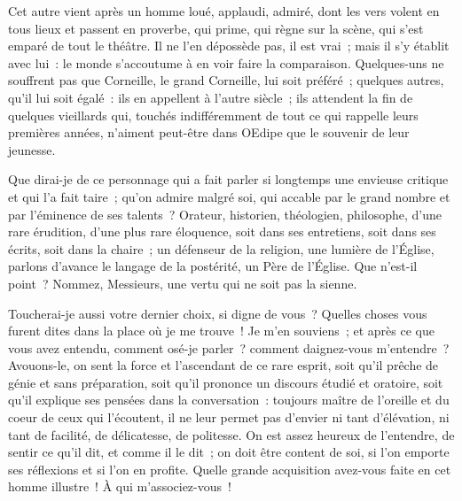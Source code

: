 \documentclass[french,twoside]{book} %
\begin{document}
Cet autre vient après un homme loué, applaudi, admiré, dont les vers volent en tous lieux et passent en proverbe, qui prime, qui règne sur la scène, qui s’est emparé de tout le théâtre. Il ne l’en dépossède pas, il est vrai ; mais il s’y établit avec lui : le monde s’accoutume à en voir faire la comparaison. Quelques-uns ne souffrent pas que Corneille, le grand Corneille, lui soit préféré ; quelques autres, qu’il lui soit égalé : ils en appellent à l’autre siècle ; ils attendent la fin de quelques vieillards qui, touchés indifféremment de tout ce qui rappelle leurs premières années, n’aiment peut-être dans OEdipe que le souvenir de leur jeunesse.\par
Que dirai-je de ce personnage qui a fait parler si longtemps une envieuse critique et qui l’a fait taire ; qu’on admire malgré soi, qui accable par le grand nombre et par l’éminence de ses talents ? Orateur, historien, théologien, philosophe, d’une rare érudition, d’une plus rare éloquence, soit dans ses entretiens, soit dans ses écrits, soit dans la chaire ; un défenseur de la religion, une lumière de l’Église, parlons d’avance le langage de la postérité, un Père de l’Église. Que n’est-il point ? Nommez, Messieurs, une vertu qui ne soit pas la sienne.\par
Toucherai-je aussi votre dernier choix, si digne de vous ? Quelles choses vous furent dites dans la place où je me trouve ! Je m’en souviens ; et après ce que vous avez entendu, comment osé-je parler ? comment daignez-vous m’entendre ? Avouons-le, on sent la force et l’ascendant de ce rare esprit, soit qu’il prêche de génie et sans préparation, soit qu’il prononce un discours étudié et oratoire, soit qu’il explique ses pensées dans la conversation : toujours maître de l’oreille et du coeur de ceux qui l’écoutent, il ne leur permet pas d’envier ni tant d’élévation, ni tant de facilité, de délicatesse, de politesse. On est assez heureux de l’entendre, de sentir ce qu’il dit, et comme il le dit ; on doit être content de soi, si l’on emporte ses réflexions et si l’on en profite. Quelle grande acquisition avez-vous faite en cet homme illustre ! À qui m’associez-vous !\par
\end{document}
